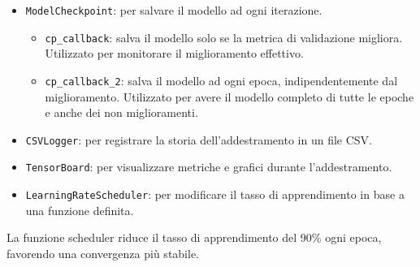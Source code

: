 \documentclass[12pt,a4paper,openright,twoside]{book}
\begin{document}
\begin{itemize}
    \item[-] \texttt{ModelCheckpoint}: per salvare il modello ad ogni iterazione. 
        \begin{itemize}
            \item \texttt{cp\_callback}: salva il modello solo se la metrica di validazione migliora. Utilizzato per monitorare il miglioramento effettivo.
            \item \texttt{cp\_callback\_2}: salva il modello ad ogni epoca, indipendentemente dal miglioramento. Utilizzato per avere il modello completo di tutte le epoche e anche dei non miglioramenti.
        \end{itemize}
    \item[-] \texttt{CSVLogger}: per registrare la storia dell'addestramento in un file CSV.
    \item[-] \texttt{TensorBoard}: per visualizzare metriche e grafici durante l'addestramento.
    \item[-] \texttt{LearningRateScheduler}: per modificare il tasso di apprendimento in base a una funzione definita.
\end{itemize}
La funzione scheduler riduce il tasso di apprendimento del 90\% ogni epoca, favorendo una convergenza più stabile.
\end{document}
